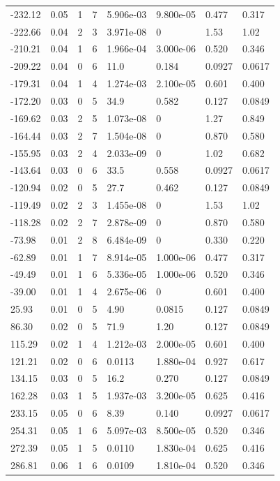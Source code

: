 \documentclass[preview]{standalone}
\begin{document}
{{\begin{tabular}{L{1.2cm}C{1.2cm} C{0.3cm}C{0.5cm} C{1.4cm}C{1.4cm} C{1.4cm}C{1.4cm}}
  -232.12  &  0.05  & 1     &  7 &  5.906e-03  & 9.800e-05  & 0.477 &  0.317   \\ 
  -222.66  &  0.04  & 2     &  3 &  3.971e-08  & 0  & 1.53 &  1.02   \\ 
  -210.21  &  0.04  & 1     &  6 &  1.966e-04  & 3.000e-06  & 0.520 &  0.346   \\ 
  -209.22  &  0.04  & 0     &  6 &  11.0  & 0.184  & 0.0927 &  0.0617   \\ 
  -179.31  &  0.04  & 1     &  4 &  1.274e-03  & 2.100e-05  & 0.601 &  0.400   \\ 
  -172.20  &  0.03  & 0     &  5 &  34.9  & 0.582  & 0.127 &  0.0849   \\ 
  -169.62  &  0.03  & 2     &  5 &  1.073e-08  & 0  & 1.27 &  0.849   \\ 
  -164.44  &  0.03  & 2     &  7 &  1.504e-08  & 0  & 0.870 &  0.580   \\ 
  -155.95  &  0.03  & 2     &  4 &  2.033e-09  & 0  & 1.02 &  0.682   \\ 
  -143.64  &  0.03  & 0     &  6 &  33.5  & 0.558  & 0.0927 &  0.0617   \\ 
  -120.94  &  0.02  & 0     &  5 &  27.7  & 0.462  & 0.127 &  0.0849   \\ 
  -119.49  &  0.02  & 2     &  3 &  1.455e-08  & 0  & 1.53 &  1.02   \\ 
  -118.28  &  0.02  & 2     &  7 &  2.878e-09  & 0  & 0.870 &  0.580   \\ 
  -73.98  &  0.01  & 2     &  8 &  6.484e-09  & 0  & 0.330 &  0.220   \\ 
  -62.89  &  0.01  & 1     &  7 &  8.914e-05  & 1.000e-06  & 0.477 &  0.317   \\ 
  -49.49  &  0.01  & 1     &  6 &  5.336e-05  & 1.000e-06  & 0.520 &  0.346   \\ 
  -39.00  &  0.01  & 1     &  4 &  2.675e-06  & 0  & 0.601 &  0.400   \\ 
  25.93  &  0.01  & 0     &  5 &  4.90  & 0.0815  & 0.127 &  0.0849   \\ 
  86.30  &  0.02  & 0     &  5 &  71.9  & 1.20  & 0.127 &  0.0849   \\ 
  115.29  &  0.02  & 1     &  4 &  1.212e-03  & 2.000e-05  & 0.601 &  0.400   \\ 
  121.21  &  0.02  & 0     &  6 &  0.0113  & 1.880e-04  & 0.927 &  0.617   \\ 
  134.15  &  0.03  & 0     &  5 &  16.2  & 0.270  & 0.127 &  0.0849   \\ 
  162.28  &  0.03  & 1     &  5 &  1.937e-03  & 3.200e-05  & 0.625 &  0.416   \\ 
  233.15  &  0.05  & 0     &  6 &  8.39  & 0.140  & 0.0927 &  0.0617   \\ 
  254.31  &  0.05  & 1     &  6 &  5.097e-03  & 8.500e-05  & 0.520 &  0.346   \\ 
  272.39  &  0.05  & 1     &  5 &  0.0110  & 1.830e-04  & 0.625 &  0.416   \\ 
  286.81  &  0.06  & 1     &  6 &  0.0109  & 1.810e-04  & 0.520 &  0.346   \\ 
\hline 
\end{tabular} 

}}
\end{document}

